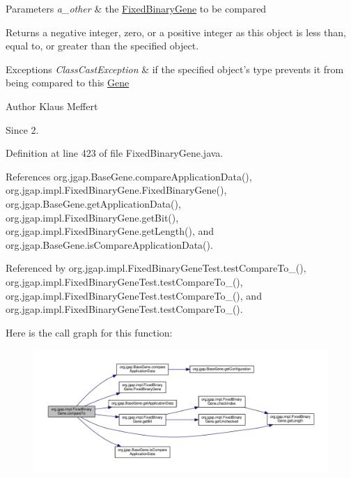 \begin{DoxyParams}{Parameters}
{\em a\-\_\-other} & the \hyperlink{classorg_1_1jgap_1_1impl_1_1_fixed_binary_gene}{Fixed\-Binary\-Gene} to be compared \\
\hline
\end{DoxyParams}
\begin{DoxyReturn}{Returns}
a negative integer, zero, or a positive integer as this object is less than, equal to, or greater than the specified object.
\end{DoxyReturn}

\begin{DoxyExceptions}{Exceptions}
{\em Class\-Cast\-Exception} & if the specified object's type prevents it from being compared to this \hyperlink{interfaceorg_1_1jgap_1_1_gene}{Gene}\\
\hline
\end{DoxyExceptions}
\begin{DoxyAuthor}{Author}
Klaus Meffert 
\end{DoxyAuthor}
\begin{DoxySince}{Since}
2. 
\end{DoxySince}


Definition at line 423 of file Fixed\-Binary\-Gene.\-java.



References org.\-jgap.\-Base\-Gene.\-compare\-Application\-Data(), org.\-jgap.\-impl.\-Fixed\-Binary\-Gene.\-Fixed\-Binary\-Gene(), org.\-jgap.\-Base\-Gene.\-get\-Application\-Data(), org.\-jgap.\-impl.\-Fixed\-Binary\-Gene.\-get\-Bit(), org.\-jgap.\-impl.\-Fixed\-Binary\-Gene.\-get\-Length(), and org.\-jgap.\-Base\-Gene.\-is\-Compare\-Application\-Data().



Referenced by org.\-jgap.\-impl.\-Fixed\-Binary\-Gene\-Test.\-test\-Compare\-To\-\_(), org.\-jgap.\-impl.\-Fixed\-Binary\-Gene\-Test.\-test\-Compare\-To\-\_(), org.\-jgap.\-impl.\-Fixed\-Binary\-Gene\-Test.\-test\-Compare\-To\-\_(), and org.\-jgap.\-impl.\-Fixed\-Binary\-Gene\-Test.\-test\-Compare\-To\-\_().



Here is the call graph for this function\-:
\nopagebreak
\begin{figure}[H]
\begin{center}
\leavevmode
\includegraphics[width=350pt]{classorg_1_1jgap_1_1impl_1_1_fixed_binary_gene_a35ddbee61a1634d7f92b12304672f10b_cgraph}
\end{center}
\end{figure}


